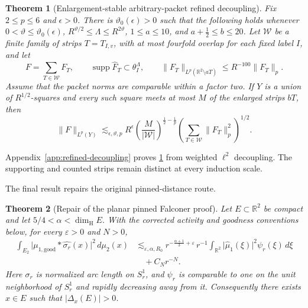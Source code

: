\documentclass[11pt,letterpaper]{amsart}
\newtheorem{theorem}{Theorem}[section]
\newcommand{\R}{\mathbb{R}}
\newcommand{\supp}{\operatorname{supp}}
\newcommand{\wh}{\widehat}
\newcommand{\eps}{\varepsilon}
\newcommand{\cW}{\mathcal{W}}
\newcommand{\abs}[1]{\lvert#1\rvert}
\newcommand{\norm}[1]{\lVert#1\rVert}
\begin{document}
\begin{theorem}[Enlargement-stable arbitrary-packet refined decoupling]
\label{thm:enlargement-stable}
Fix \(2\le p\le6\) and \(\epsilon>0\).  There is
\(\vartheta_0(\epsilon)>0\) such that the following holds whenever
\(0<\vartheta\le\vartheta_0(\epsilon)\),
\(R^{\vartheta/2}\le\Lambda\le R^{2\vartheta}\),
\(1\le a\le10\), and \(a+\tfrac12\le b\le20\).
Let \(\cW\) be a finite family of strips \(T=T_{I,v}\), with at most
fourfold overlap for each fixed label \(I\), and let
\[
 F=\sum_{T\in\cW}F_T,\qquad
 \supp\wh F_T\subset\theta_I^\Lambda,\qquad
 \norm{F_T}_{L^p(\R^2\setminus aT)}
 \le R^{-100}\norm{F_T}_p.
\]
Assume that the packet norms are comparable within a factor two.  If \(Y\)
is a union of \(R^{1/2}\)-squares and every such square meets at most \(M\)
of the enlarged strips \(bT\), then
\begin{equation}\label{eq:enlargement-stable}
 \norm{F}_{L^p(Y)}
 \lesssim_{\epsilon,\vartheta,p}
 R^\epsilon
 \left(\frac{M}{\abs{\cW}}\right)^{\frac12-\frac1p}
 \left(\sum_{T\in\cW}\norm{F_T}_p^2\right)^{1/2}.
\end{equation}
\end{theorem}

Appendix~\ref{app:refined-decoupling} proves
\cref{thm:enlargement-stable} from weighted \(\ell^2\) decoupling.  The
supporting and counted strips remain distinct at every induction scale.

The final result repairs the original pinned-distance route.

\begin{theorem}[Repair of the planar pinned Falconer proof]
\label{thm:main}
Let \(E\subset\R^2\) be compact and let
\(5/4<\alpha<\dim_{\mathrm H}E\).  With the corrected activity and goodness
conventions below, for every \(\eps>0\) and \(N>0\),
\begin{equation}\label{eq:main-frequency}
\begin{aligned}
 \int_{E_2}\abs{\mu_{1,\mathrm{good}}*\wh{\sigma_r}(x)}^2\,d\mu_2(x)
 &\lesssim_{\eps,\alpha,R_0}
 r^{-\frac{\alpha+1}{3}+\eps}\,r^{-1}
 \int_{\R^2}\abs{\wh\mu_1(\xi)}^2\psi_r(\xi)\,d\xi\\
 &\quad+C_Nr^{-N}.
\end{aligned}
\end{equation}
Here \(\sigma_r\) is normalized arc length on \(S_r^1\), and \(\psi_r\)
is comparable to one on the unit neighborhood of \(S_r^1\) and rapidly
decreasing away from it.  Consequently there exists \(x\in E\) such that
\(\abs{\Delta_x(E)}>0\).
\end{theorem}
\end{document}

